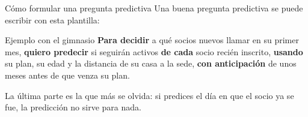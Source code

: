 \documentclass[aspectratio=169,11pt]{beamer}
\begin{document}
\begin{frame}[t]{Cómo formular una pregunta predictiva}
  \small
  Una buena pregunta predictiva se puede escribir con esta plantilla:
  \vspace{0.1cm}
  \begin{center}
  \end{center}
  \begin{exampleblock}{Ejemplo con el gimnasio}
    \small \textbf{Para decidir} a qué socios nuevos llamar en su primer
    mes, \textbf{quiero predecir} si seguirán activos \textbf{de cada} socio
    recién inscrito, \textbf{usando} su plan, su edad y la distancia de su
    casa a la sede, \textbf{con anticipación} de unos meses antes de que
    venza su plan.
  \end{exampleblock}
  \footnotesize La última parte es la que más se olvida: si predices el
  día en que el socio ya se fue, la predicción no sirve para nada.
\end{frame}
\end{document}
